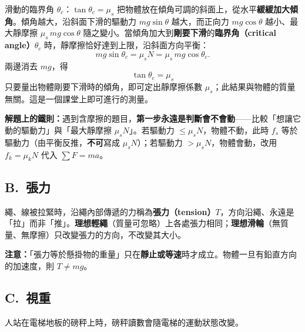 \documentclass[11pt]{article}
\begin{document}
\begin{補充框}{滑動的臨界角 $\theta_c$：$\tan\theta_c=\mu_s$}
把物體放在傾角可調的斜面上，從水平\textbf{緩緩加大傾角}。傾角越大，沿斜面下滑的驅動力 $mg\sin\theta$ 越大，而正向力 $mg\cos\theta$ 越小、最大靜摩擦 $\mu_s\,mg\cos\theta$ 隨之變小。當傾角加大到\textbf{剛要下滑}的\textbf{臨界角（critical angle）$\theta_c$} 時，靜摩擦恰好達到上限，沿斜面方向平衡：
$$mg\sin\theta_c = \mu_s N = \mu_s\, mg\cos\theta_c.$$
兩邊消去 $mg$，得
$$\boxed{\;\tan\theta_c = \mu_s\;}$$
只要量出物體剛要下滑時的傾角，即可定出靜摩擦係數 $\mu_s$；此結果與物體的質量無關。這是一個課堂上即可進行的測量。
\end{補充框}

\textbf{解題上的鐵則：}遇到含摩擦的題目，\textbf{第一步永遠是判斷會不會動}——比較「想讓它動的驅動力」與「最大靜摩擦 $\mu_s N$」。若驅動力 $\le\mu_s N$，物體不動，此時 $f_s$ 等於驅動力（由平衡反推，\textbf{不可}寫成 $\mu_s N$）；若驅動力 $>\mu_s N$，物體會動，改用 $f_k=\mu_k N$ 代入 $\sum F=ma$。

\subsection*{\sffamily B.\ 張力}

繩、線被拉緊時，沿繩內部傳遞的力稱為\textbf{張力（tension）$T$}，方向沿繩、永遠是「拉」而非「推」。\textbf{理想輕繩}（質量可忽略）上各處張力相同；\textbf{理想滑輪}（無質量、無摩擦）只改變張力的方向，不改變其大小。

\textbf{注意：}「張力等於懸掛物的重量」只在\textbf{靜止或等速}時才成立。物體一旦有鉛直方向的加速度，則 $T\neq mg$。

\subsection*{\sffamily C.\ 視重}

人站在電梯地板的磅秤上時，磅秤讀數會隨電梯的運動狀態改變。
\end{document}
